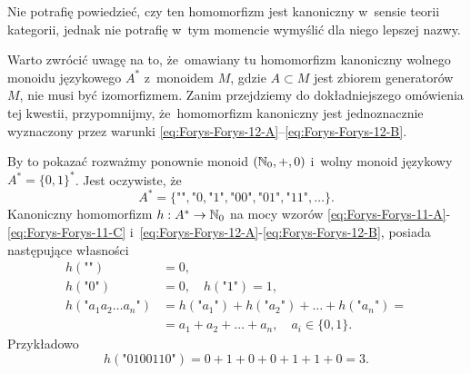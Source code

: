 \documentclass[a4paper,11pt]{article}
\begin{document}
Nie potrafię powiedzieć, czy ten homomorfizm jest kanoniczny w~sensie teorii
kategorii, jednak nie potrafię w~tym momencie wymyślić dla niego lepszej
nazwy.

\vspace{\spaceFour}




\start {} Warto zwrócić uwagę na to, że~omawiany tu homomorfizm
kanoniczny wolnego monoidu językowego $A^{ * }$ z~monoidem $M$, gdzie
$A \subset M$ jest zbiorem generatorów $M$, nie musi być izomorfizmem. Zanim
przejdziemy do dokładniejszego omówienia tej kwestii, przypomnijmy,
że~homomorfizm kanoniczny jest jednoznacznie wyznaczony przez warunki
\eqref{eq:Forys-Forys-12-A}--\eqref{eq:Forys-Forys-12-B}.

By to pokazać rozważmy
ponownie monoid $( \mathbb{N}_{ 0 }, +, 0 )$ i~wolny monoid językowy
$A^{ * } = \{ 0, 1 \}^{ * }$. Jest
oczywiste, że
\begin{equation}
  \label{eq:Forys-Forys-13}
  A^{ * } =
  \{ \textrm{""}, \textrm{"} 0, \textrm{"} 1 \textrm{"},
  \textrm{"} 0 0 \textrm{"}, \textrm{"} 0 1 \textrm{"},
  \textrm{"} 1 1 \textrm{"}, \ldots \}.
\end{equation}
Kanoniczny homomorfizm $h : A^{ * } \to \mathbb{N}_{ 0 }$ na mocy wzorów
\eqref{eq:Forys-Forys-11-A}-\eqref{eq:Forys-Forys-11-C}
i~\eqref{eq:Forys-Forys-12-A}-\eqref{eq:Forys-Forys-12-B}, posiada
następujące własności
\begin{subequations}
  \begin{align}
    \label{eq:Forys-Forys-14-A}
    h( \textrm{""} ) &= 0, \\
    \label{eq:Forys-Forys-14-B}
    h( \textrm{"} 0 \textrm{"} ) &= 0, \quad
    h( \textrm{"} 1 \textrm{"} ) = 1, \\
    \label{eq:Forys-Forys-14-C}
    h( \textrm{"} a_{ 1 } a_{ 2 } \ldots a_{ n } \textrm{"} )
                     &= h( \textrm{"} a_{ 1 } \textrm{"} )
                       + h( \textrm{"} a_{ 2 } \textrm{"} ) + \ldots
                       + h( \textrm{"} a_{ n } \textrm{"} ) = \\
                     &= a_{ 1 } + a_{ 2 } + \ldots + a_{ n }, \quad
                       a_{ i } \in \{ 0, 1 \}.
  \end{align}
\end{subequations}
Przykładowo
\begin{equation}
  \label{eq:Forys-Forys-15}
  h( \textrm{"} 0100110 \textrm{"} ) =
  0 + 1 + 0 + 0 + 1 + 1 + 0 = 3.
\end{equation}
\end{document}
